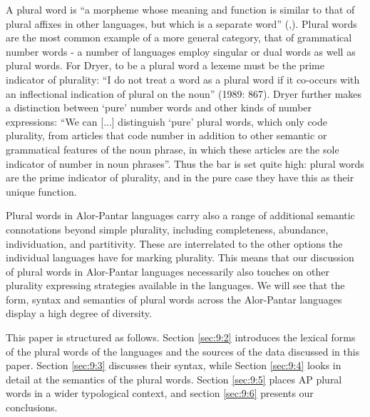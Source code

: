 A plural word is ``a morpheme whose meaning and function is similar to that of plural affixes in other languages, but which is a separate word'' (\citealt[865]{Dryer1989},\citealt[166]{Dryer2007}). Plural words are the most common example of a more general category, that of grammatical number words - a number of languages employ singular or dual words as well as plural words. For Dryer, to be a plural word a lexeme must be the prime indicator of plurality: ``I do not treat a word as a plural word if it co-occurs with an inflectional indication of plural on the noun'' (1989: 867). Dryer further makes a distinction between `pure' number words and other kinds of number expressions: ``We can [...] distinguish `pure' plural words, which only code plurality, from articles that code number in addition to other semantic or grammatical features of the noun phrase, in which these articles are the sole indicator of number in noun phrases''. Thus the bar is set quite high: plural words are the prime indicator of plurality, and in the
pure case they have this as their unique function.

 Plural words in Alor-Pantar languages carry also a range of additional semantic connotations beyond simple plurality, including completeness, abundance, individuation, and partitivity. These are interrelated to the other options the individual languages have for marking plurality. This means that our discussion of plural words in Alor-Pantar languages necessarily also touches on other plurality expressing strategies available in the languages. We will see that the form, syntax and semantics of plural words across the Alor-Pantar languages display a high degree of diversity.

This paper is structured as follows. Section \ref{sec:9:2} introduces the lexical forms of the plural words of the languages and the sources of the data discussed in this paper. Section \ref{sec:9:3} discusses their syntax, while Section \ref{sec:9:4} looks in detail at the semantics of the plural words. Section \ref{sec:9:5} places AP plural words in a wider typological context, and section \ref{sec:9:6} presents our conclusions.

